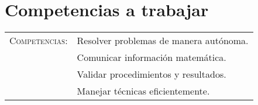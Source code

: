 \documentclass[letterpaper,10pt]{article}
\begin{document}
\section{Competencias a trabajar}
\begin{tabular}[t]{R{0.25\textwidth}p{0.71\textwidth}}
    \textsc{Competencias: } &   Resolver problemas de manera aut\'onoma. \\ 
                            &   Comunicar información matem\'atica. \\
                            &   Validar procedimientos y resultados. \\
                            &   Manejar t\'ecnicas eficientemente. \\
\end{tabular}

\end{document}
